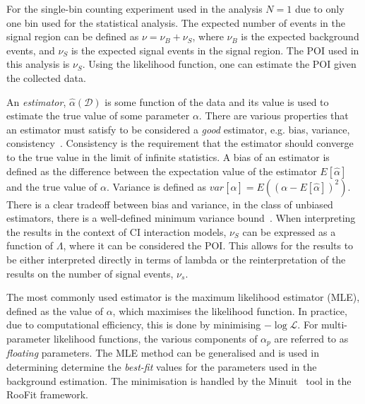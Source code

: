 For the single-bin counting experiment used in the analysis $N = 1$ due to only one bin used for the statistical analysis. The expected number of events in the signal region can be defined as $\nu = \nu_B +\nu_S$, where $\nu_B$ is the expected background events, and $\nu_S$ is the expected signal events in the signal region. The POI used in this analysis is $\nu_S$. Using the likelihood function, one can estimate the POI given the collected data. 

An \emph{estimator}, $\hat{\alpha}(\mathcal{D})$ is some function of the data and its value is used to estimate the true value of some parameter $\alpha$. There are various properties that an estimator must satisfy to be considered a \emph{good} estimator, e.g. bias, variance, consistency~\cite{errorsOnNumbers}. Consistency is the requirement that the estimator should converge to the true value in the limit of infinite statistics. A bias of an estimator is defined as the difference between the expectation value of the estimator $E[\hat{\alpha}]$ and the true value of $\alpha$. Variance is defined as $var[\hat{\alpha}] = E\left((\alpha - E[\hat{\alpha}])^{2}\right)$. There is a clear tradeoff between bias and variance, in the class of unbiased estimators, there is a well-defined minimum variance bound~\cite{Cranmer:2015nia}. When interpreting the results in the context of CI interaction models, $\nu_S$ can be expressed as a function of $\Lambda$, where it can be considered the POI. This allows for the results to be either interpreted directly in terms of lambda or the reinterpretation of the results on the number of signal events, $\nu_s$.

The most commonly used estimator is the maximum likelihood estimator (MLE), defined as the value of $\alpha$, which maximises the likelihood function. In practice, due to computational efficiency, this is done by minimising $-\log\mathcal{L}$. For multi-parameter likelihood functions, the various components of $\alpha_p$ are referred to as \emph{floating} parameters. The MLE method can be generalised and is used in determining determine the \emph{best-fit} values for the parameters used in the background estimation. The minimisation is handled by the Minuit~\cite{James:873119} tool in the RooFit framework.

